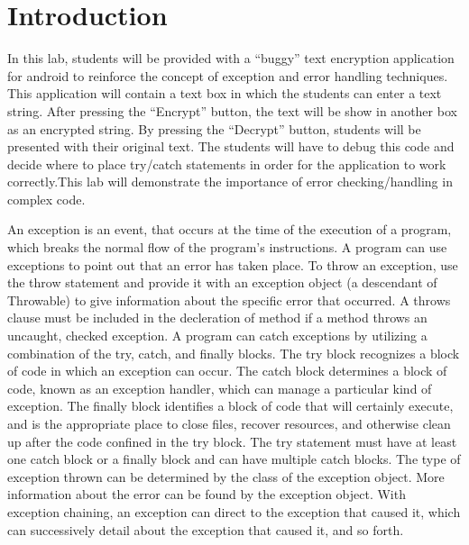 \section{Introduction}

In this lab, students will be provided with a “buggy” text encryption application for android to reinforce the concept of exception and error handling techniques. This application will contain a text box in which the students can enter a text string.  After pressing the “Encrypt” button, the text will be show in another box as an encrypted string. By pressing the “Decrypt” button, students will be presented with their original text. The students will have to debug this code and decide where to place try/catch statements in order for the application to work correctly.This lab will demonstrate the importance of error checking/handling in complex code.

An exception is an event, that occurs at the time of the execution of a program, which breaks the normal flow of the program's instructions. A program can use exceptions to point out that an error has taken place. To throw an exception, use the throw statement and provide it with an exception object (a descendant of Throwable) to give information about the specific error that occurred. A throws clause must be included in the decleration of method if a method throws an uncaught, checked exception. A program can catch exceptions by utilizing a combination of the try, catch, and finally blocks. The try block recognizes a block of code in which an exception can occur. The catch block determines a block of code, known as an exception handler, which can manage a particular kind of exception. The finally block identifies a block of code that will certainly execute, and is the appropriate place to close files, recover resources, and otherwise clean up after the code confined in the try block. The try statement must have at least one catch block or a finally block and can have multiple catch blocks. The type of exception thrown can be determined by the class of the exception object. More information about the error can be found by the exception object. With exception chaining, an exception can direct to the exception that caused it, which can successively detail about the exception that caused it, and so forth.
